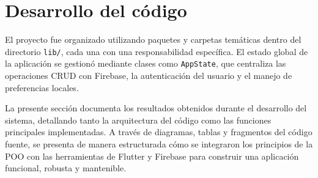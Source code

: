  
































































\newpage
\section{Desarrollo del código}
El proyecto fue organizado utilizando paquetes y carpetas temáticas dentro del directorio \texttt{lib/}, cada una con una responsabilidad específica. El estado global de la aplicación se gestionó mediante clases como \texttt{AppState}, que centraliza las operaciones CRUD con Firebase, la autenticación del usuario y el manejo de preferencias locales.

La presente sección documenta los resultados obtenidos durante el desarrollo del sistema, detallando tanto la arquitectura del código como las funciones principales implementadas. A través de diagramas, tablas y fragmentos del código fuente, se presenta de manera estructurada cómo se integraron los principios de la POO con las herramientas de Flutter y Firebase para construir una aplicación funcional, robusta y mantenible.


